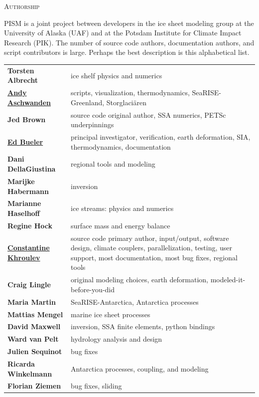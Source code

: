 \documentclass[titlepage,letterpaper,final]{scrartcl}
\begin{document}
\centerline{\textsc{Authorship}}
\bigskip

\normalspacing
PISM is a joint project between developers in the ice sheet modeling group at the University of Alaska (UAF) and at the Potsdam Institute for Climate Impact Research (PIK).  The number of source code authors, documentation authors, and script contributors is large. Perhaps the best description is this alphabetical list.
\bigskip
\normalspacing

\renewcommand{\arraystretch}{1.3}
\begin{tabular}{ll}
\textbf{Torsten Albrecht} & ice shelf physics and numerics \\
\textbf{\underline{Andy Aschwanden}} & \begin{minipage}[t]{4in} scripts, visualization, thermodynamics, SeaRISE-Greenland, Storglaci\"aren  \end{minipage}  \\
\textbf{Jed Brown} & source code original author, SSA numerics, PETSc underpinnings \\
\textbf{\underline{Ed Bueler}} & \begin{minipage}[t]{4in} principal investigator, verification, earth deformation, SIA, thermodynamics, documentation  \end{minipage} \\
\textbf{Dani DellaGiustina} & regional tools and modeling \\
\textbf{Marijke Habermann} & inversion\\
\textbf{Marianne Haselhoff} & ice streams: physics and numerics\\
\textbf{Regine Hock} & surface mass and energy balance \\
\textbf{\underline{Constantine Khroulev}} & \begin{minipage}[t]{4in} source code primary author, input/output, software design, climate couplers, parallelization, testing, user support, most documentation, most bug fixes, regional tools \end{minipage} \\
\textbf{Craig Lingle}\index{People!Lingle, Craig} & original modeling choices, earth deformation, modeled-it-before-you-did \\
\textbf{Maria Martin} & SeaRISE-Antarctica, Antarctica processes \\
\textbf{Mattias Mengel} & marine ice sheet processes \\
\textbf{David Maxwell} & inversion, SSA finite elements, python bindings \\
\textbf{Ward van Pelt} & hydrology analysis and design \\
\textbf{Julien Sequinot} & bug fixes \\
\textbf{Ricarda Winkelmann} & Antarctica processes, coupling, and modeling  \\
\textbf{Florian Ziemen} & bug fixes, sliding \\
\end{tabular}
\end{document}
